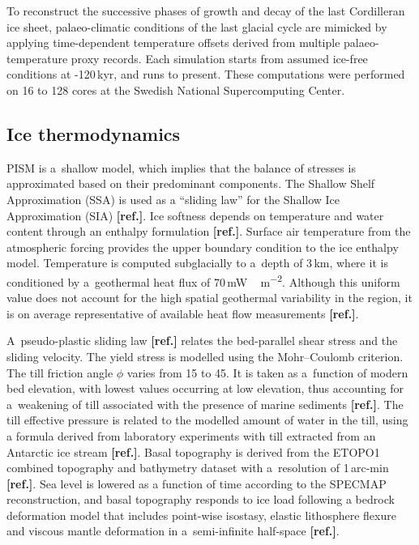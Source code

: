 \documentclass[tc, ms]{copernicus}
\newcommand{\aref}[0]{\textbf{[ref.]}}
\renewcommand{\citep}[1]{\aref}
\begin{document}
To reconstruct the successive phases of growth and decay of the last Cordilleran
ice sheet, palaeo-climatic conditions of the last glacial cycle are mimicked
by applying time-dependent temperature offsets derived from multiple
palaeo-temperature proxy records. Each simulation starts from assumed ice-free
conditions at -120\,kyr, and runs to present. These computations were
performed on 16 to 128 cores at the Swedish National Supercomputing
Center.

\subsection{Ice thermodynamics}

PISM is a~shallow model, which implies that the balance of stresses is
approximated based on their predominant components.
The Shallow Shelf Approximation (SSA) is used as a ``sliding law'' for the
Shallow Ice Approximation (SIA) \citep{bueler-brown-2009,winkelmann-etal-2011}.
Ice softness depends on temperature and water content through an enthalpy
formulation \citep{aschwanden-blatter-2009,aschwanden-etal-2012}. Surface air
temperature from the atmospheric forcing provides the upper boundary condition
to the ice enthalpy model. Temperature is computed subglacially to a~depth of
3\,km, where it is conditioned by a~geothermal heat flux of
70\,\unit{mW\,m^{-2}}. Although this uniform value does not
account for the high spatial geothermal variability in the region, it is on
average representative of available heat flow measurements
\citep{artemieva-mooney-2001,blackwell-richards-2004}.

A~pseudo-plastic sliding law \citep{aschwanden-etal-2013} relates the
bed-parallel shear stress and the sliding velocity. The yield stress is
modelled using the Mohr--Coulomb criterion. The till friction angle $\phi$
varies from 15 to 45{\degree}. It is taken as a~function of modern bed
elevation, with lowest values occurring at low elevation, thus accounting
for a~weakening of till associated with the presence of marine sediments
\citep{martin-etal-2011,aschwanden-etal-2013}. The till effective pressure is
related to the modelled amount of water in the till, using a formula derived
from laboratory experiments with till extracted from an Antarctic ice stream
\aref. Basal topography is derived from the ETOPO1 combined topography
and bathymetry dataset with a~resolution of 1\,arc-min \citep{data:etopo1}.
Sea level is lowered as a function of time according to the SPECMAP
reconstruction, and basal topography responds to ice load
following a bedrock deformation model that includes point-wise isostasy,
elastic lithosphere flexure and viscous mantle deformation in a~semi-infinite
half-space \citep{lingle-clark-1985,bueler-etal-2007}.
\end{document}
